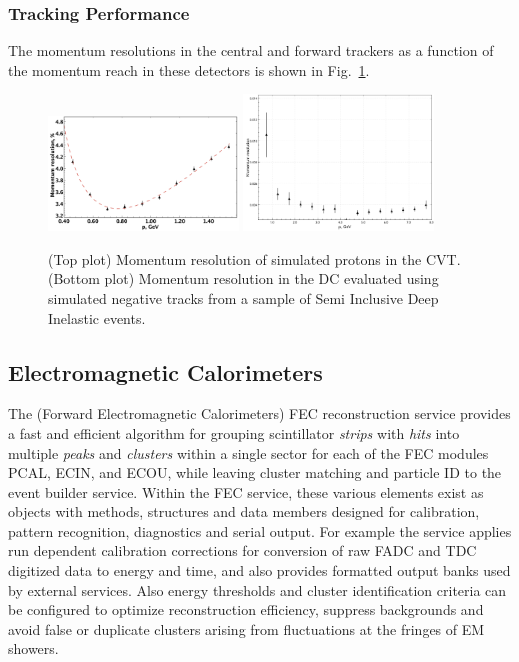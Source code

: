 \documentclass[3p,times,twocolumn]{elsarticle}
\begin{document}
\subsubsection{Tracking Performance}

The momentum resolutions in the central and forward trackers as a function of the momentum reach
in these detectors is shown in Fig.~\ref{fig:res}.

\begin{figure}
\includegraphics[width=0.45\textwidth]{pics/fddegipekmpjjiho.png}
\includegraphics[width=0.45\textwidth]{pics/DCRes.png}
\caption{(Top plot) Momentum resolution of simulated protons in the CVT.
(Bottom plot) Momentum resolution in the DC evaluated using simulated negative tracks from a sample of Semi Inclusive
Deep Inelastic events.
}
\label{fig:res}
\end{figure}

\pagebreak
\subsection{Electromagnetic Calorimeters}

The (Forward Electromagnetic Calorimeters) FEC reconstruction service provides a fast and efficient algorithm for grouping scintillator {\it strips} with
{\it hits} into multiple {\it peaks} and {\it clusters} within a single sector for each of the FEC modules PCAL, ECIN,
and ECOU, while leaving cluster matching and particle ID to the event builder service.  Within the FEC service, these
various elements exist as objects with methods, structures and data members designed for calibration, pattern
recognition, diagnostics and serial output.  For example the service applies run dependent calibration corrections for
conversion of raw FADC and TDC digitized data to energy and time, and also provides formatted output banks used by
external services.  Also energy thresholds and cluster identification criteria can be configured to optimize reconstruction
efficiency, suppress backgrounds and avoid false or duplicate clusters arising from fluctuations at the fringes of EM
showers.
\end{document}
